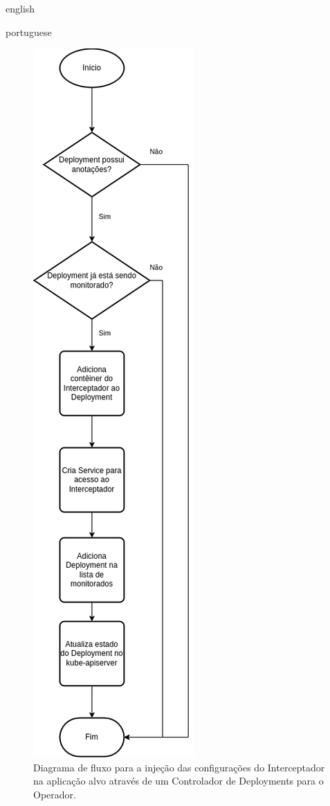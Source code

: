 \begin{otherlanguage*}{english}
\begin{otherlanguage*}{portuguese}
\begin{figure}[h]
\includegraphics[scale=0.46]{images/deployment-controller.png}
\caption{Diagrama de fluxo para a injeção das configurações do Interceptador na aplicação alvo através de um Controlador de Deployments para o Operador.}
\label{fig:deployment-controller-diagram}
\end{figure}


\end{otherlanguage*}
\end{otherlanguage*}
